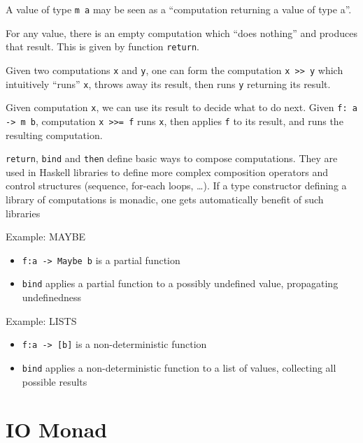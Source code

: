 A value of type \lstinline|m a| may be seen as a ``computation returning a value of type a''.

For any value, there is an empty computation which ``does nothing'' and
produces that result. This is given by function \lstinline|return|.

Given two computations \lstinline|x| and \lstinline|y|, one can form the computation
\lstinline|x >> y| which intuitively ``runs'' \lstinline|x|, throws away its result, then runs \lstinline|y| returning its result.

Given computation \lstinline|x|, we can use its result to decide what to do next.
Given \lstinline|f: a -> m b|, computation \lstinline|x >>= f| runs \lstinline|x|, then applies
\lstinline|f| to its result, and runs the resulting computation.


\lstinline|return|, \lstinline|bind| and \lstinline|then| define basic ways to compose computations.
They are used in Haskell libraries to define more complex composition
operators and control structures (sequence, for-each loops, \dots).
If a type constructor defining a library of computations is monadic, one
gets automatically benefit of such libraries

Example: MAYBE
\begin{itemize}
	\item \lstinline|f:a -> Maybe b| is a partial function
	\item \lstinline|bind| applies a partial function to a possibly undefined value, propagating undefinedness
\end{itemize}
Example: LISTS
\begin{itemize}
	\item \lstinline|f:a -> [b]| is a non-deterministic function
	\item \lstinline|bind| applies a non-deterministic function to a list of values, collecting all possible results

\end{itemize}
\section{IO Monad}
